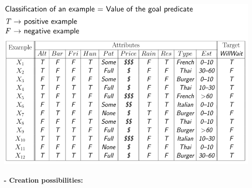 \documentclass{article}
\begin{document}
\includegraphics[scale=0.3]{85.png}\\\\
\textbf{- Creation possibilities: }\\
\end{document}
